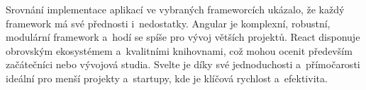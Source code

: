 
Srovnání implementace aplikací ve vybraných frameworcích ukázalo, že každý framework má své přednosti i~nedostatky. 
Angular je komplexní, robustní, modulární framework a~hodí se spíše pro vývoj větších projektů. 
React disponuje obrovským ekosystémem a~kvalitními knihovnami, což mohou ocenit především začátečníci nebo vývojová studia. 
Svelte je díky své jednoduchosti a~přímočarosti ideální pro menší projekty a~startupy, kde je klíčová rychlost a~efektivita.